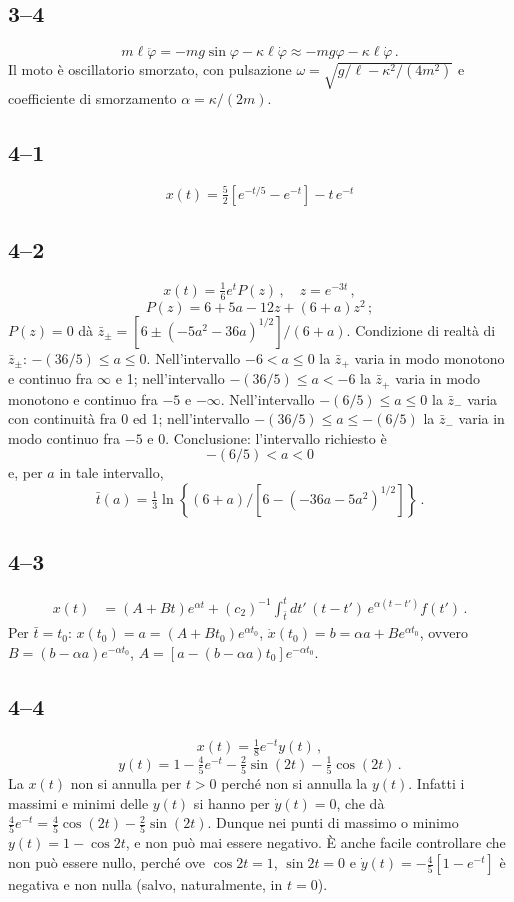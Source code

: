 \documentclass[11pt, a4paper]{book}
\numberwithin{equation}{section}
\begin{document}
\subsection*{3--4}
\[
    m\ell\ddot{\varphi} = -mg\sin\varphi - \kappa\ell\dot{\varphi} \approx -mg\varphi - \kappa\ell\dot{\varphi} \,.
\]
Il moto è oscillatorio smorzato, con pulsazione $\omega = \sqrt{g/\ell - \kappa^2/(4m^2)}$ e
coefficiente di smorzamento $\alpha = \kappa/(2m)$.

\subsection*{4--1}
\[
    x(t) = \tfrac{5}{2}\left[ e^{-t/5} - e^{-t} \right] - t \, e^{-t}
\]

\subsection*{4--2}
\[
    x(t) = \tfrac{1}{6} e^{t} P(z) \,, \quad z = e^{-3t} \,,
\]
\[
    P(z) = 6 + 5a - 12z + (6+a)z^2 \,;
\]
$P(z) = 0$ dà $\bar{z}_\pm = \left[ 6 \pm (-5a^2 - 36a)^{1/2} \right] / (6+a)$.
Condizione di realtà di $\bar{z}_\pm$: $-(36/5) \leq a \leq 0$.
Nell'intervallo $-6 < a \leq 0$ la $\bar{z}_+$ varia in modo monotono e continuo
fra $\infty$ e 1; nell'intervallo $-(36/5) \leq a < -6$ la $\bar{z}_+$ varia in modo
monotono e continuo fra $-5$ e $-\infty$. Nell'intervallo $-(6/5) \leq a \leq 0$ la
$\bar{z}_-$ varia con continuità fra 0 ed 1; nell'intervallo $-(36/5) \leq a \leq -(6/5)$
la $\bar{z}_-$ varia in modo continuo fra $-5$ e 0.
Conclusione: l'intervallo richiesto è
\[
    -(6/5) < a < 0
\]
e, per $a$ in tale intervallo,
\[
    \bar{t}(a) = \tfrac{1}{3} \ln\!\left\{ (6+a) / \left[ 6 - (-36a - 5a^2)^{1/2} \right] \right\} \,.
\]

\subsection*{4--3}
\begin{align*}
    x(t) &= (A + Bt) e^{\alpha t} + (c_2)^{-1} \int_{\bar{t}}^{t} dt' \, (t-t') \, e^{\alpha(t-t')} f(t') \,.
\end{align*}
Per $\bar{t} = t_0$: $x(t_0) = a = (A + Bt_0) e^{\alpha t_0}$, $\dot{x}(t_0) = b = \alpha a + B e^{\alpha t_0}$,
ovvero $B = (b - \alpha a) e^{-\alpha t_0}$, $A = [a - (b-\alpha a)t_0] e^{-\alpha t_0}$.

\subsection*{4--4}
\[
    x(t) = \tfrac{1}{8} e^{-t} y(t) \,,
\]
\[
    y(t) = 1 - \tfrac{4}{5} e^{-t} - \tfrac{2}{5}\sin(2t) - \tfrac{1}{5}\cos(2t) \,.
\]
La $x(t)$ non si annulla per $t>0$ perché non si annulla la $y(t)$. Infatti i
massimi e minimi delle $y(t)$ si hanno per $\dot{y}(t) = 0$, che dà
$\frac{4}{5}e^{-t} = \frac{4}{5}\cos(2t) - \frac{2}{5}\sin(2t)$. Dunque nei punti di massimo o
minimo $y(t) = 1 - \cos 2t$, e non può mai essere negativo. È anche facile
controllare che non può essere nullo, perché ove $\cos 2t = 1$, $\sin 2t = 0$ e
$\dot{y}(t) = -\frac{4}{5}[1 - e^{-t}]$ è negativa e non nulla (salvo, naturalmente, in
$t = 0$).
\end{document}
